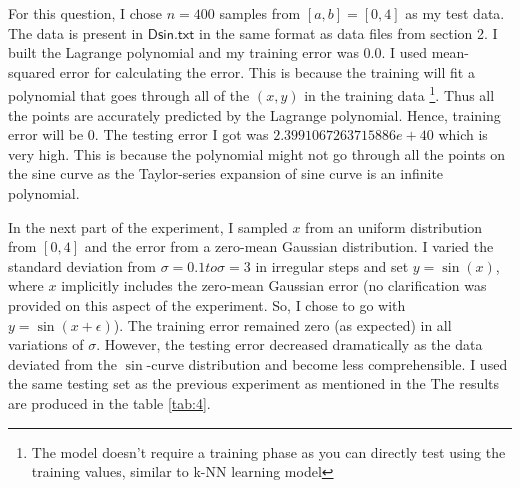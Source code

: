 \documentclass[a4paper]{article}
\theoremstyle{definition}
\newenvironment{soln}{
    \leavevmode\color{blue}\ignorespaces
}{}
\begin{document}
\begin{soln}
    For this question, I chose $n = 400$ samples from $[a, b] = [0, 4]$ as my test data.
    The data is present in $\mathsf{Dsin.txt}$ in the same format as data files from section 2.
    I built the Lagrange polynomial and my training error was 0.0.
    I used mean-squared error for calculating the error.
    This is because the training will fit a polynomial that goes through all of the $(x, y)$ in the training data \footnote{The model doesn't require a training phase as you can directly test using the training values, similar to k-NN learning model}.
    Thus all the points are accurately predicted by the Lagrange polynomial.
    Hence, training error will be 0.
    The testing error I got was $2.3991067263715886e+40$ which is very high.
    This is because the polynomial might not go through all the points on the sine curve as the Taylor-series expansion of sine curve is an infinite polynomial.

    In the next part of the experiment, I sampled $x$ from an uniform distribution from $[0, 4]$ and the error from a zero-mean Gaussian distribution.
    I varied the standard deviation from $\sigma = 0.1 to \sigma = 3$ in irregular steps and set $y = \sin(x)$, where $x$ implicitly includes the zero-mean Gaussian error (no clarification was provided on this aspect of the experiment. So, I chose to go with $y = \sin(x + \epsilon)$).
    The training error remained zero (as expected) in all variations of $\sigma$.
    However, the testing error decreased dramatically as the data deviated from the $\sin$-curve distribution and become less comprehensible.
    I used the same testing set as the previous experiment as mentioned in the 
    The results are produced in the table \ref{tab:4}.


\end{soln}
\end{document}
